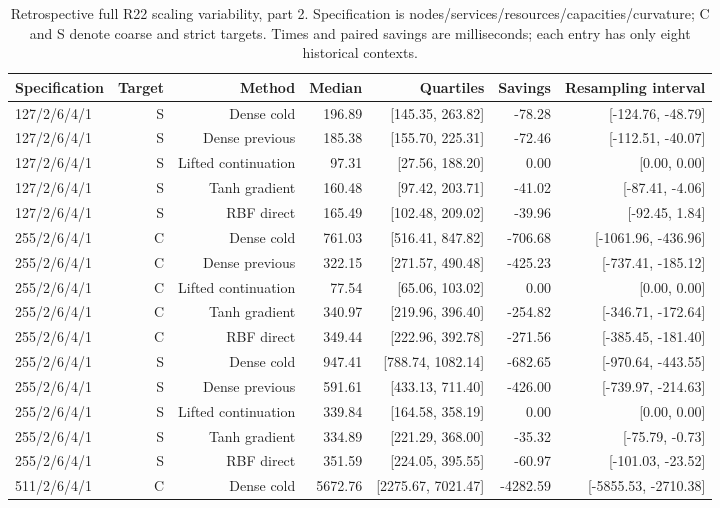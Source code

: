 \documentclass[11pt,letterpaper]{article}
\theoremstyle{definition}
\newcommand{\1}{\mathbf 1}
\begin{document}
\begin{table}[tbp]\centering\scriptsize
\caption{Retrospective full R22 scaling variability, part 2. Specification is nodes/services/resources/capacities/curvature; C and S denote coarse and strict targets. Times and paired savings are milliseconds; each entry has only eight historical contexts.}
\label{tab:r24-old-scaling-2}
\begin{tabular}{lrrrrrr}
\toprule
Specification & Target & Method & Median & Quartiles & Savings & Resampling interval\\
\midrule
127/2/6/4/1 & S & Dense cold & 196.89 & [145.35, 263.82] & -78.28 & [-124.76, -48.79]\\
127/2/6/4/1 & S & Dense previous & 185.38 & [155.70, 225.31] & -72.46 & [-112.51, -40.07]\\
127/2/6/4/1 & S & Lifted continuation & 97.31 & [27.56, 188.20] & 0.00 & [0.00, 0.00]\\
127/2/6/4/1 & S & Tanh gradient & 160.48 & [97.42, 203.71] & -41.02 & [-87.41, -4.06]\\
127/2/6/4/1 & S & RBF direct & 165.49 & [102.48, 209.02] & -39.96 & [-92.45, 1.84]\\
255/2/6/4/1 & C & Dense cold & 761.03 & [516.41, 847.82] & -706.68 & [-1061.96, -436.96]\\
255/2/6/4/1 & C & Dense previous & 322.15 & [271.57, 490.48] & -425.23 & [-737.41, -185.12]\\
255/2/6/4/1 & C & Lifted continuation & 77.54 & [65.06, 103.02] & 0.00 & [0.00, 0.00]\\
255/2/6/4/1 & C & Tanh gradient & 340.97 & [219.96, 396.40] & -254.82 & [-346.71, -172.64]\\
255/2/6/4/1 & C & RBF direct & 349.44 & [222.96, 392.78] & -271.56 & [-385.45, -181.40]\\
255/2/6/4/1 & S & Dense cold & 947.41 & [788.74, 1082.14] & -682.65 & [-970.64, -443.55]\\
255/2/6/4/1 & S & Dense previous & 591.61 & [433.13, 711.40] & -426.00 & [-739.97, -214.63]\\
255/2/6/4/1 & S & Lifted continuation & 339.84 & [164.58, 358.19] & 0.00 & [0.00, 0.00]\\
255/2/6/4/1 & S & Tanh gradient & 334.89 & [221.29, 368.00] & -35.32 & [-75.79, -0.73]\\
255/2/6/4/1 & S & RBF direct & 351.59 & [224.05, 395.55] & -60.97 & [-101.03, -23.52]\\
511/2/6/4/1 & C & Dense cold & 5672.76 & [2275.67, 7021.47] & -4282.59 & [-5855.53, -2710.38]\\

\end{tabular}
\end{table}
\end{document}
